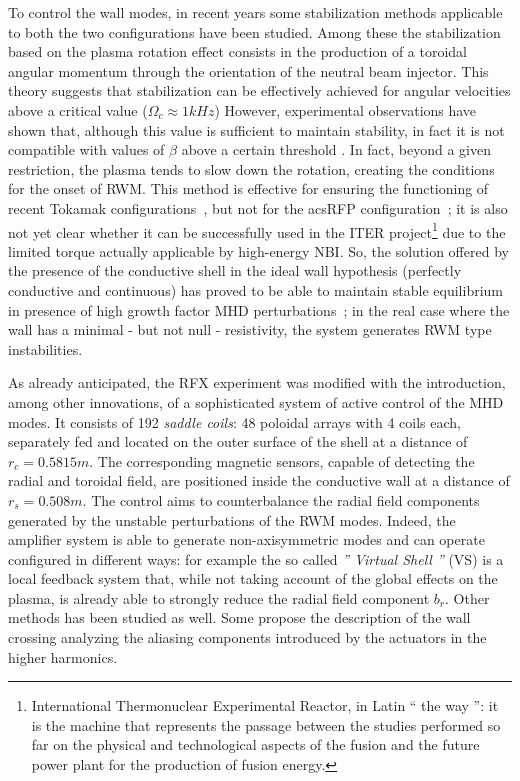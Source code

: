 To control the wall modes, in recent years some stabilization methods applicable to both the two configurations have been studied. Among these the stabilization based on the plasma rotation effect consists in the production of a toroidal angular momentum through the orientation of the neutral beam injector. This theory suggests that stabilization can be effectively achieved for angular velocities above a critical value ($\Omega_c \approx 1 kHz$) However, experimental observations have shown that, although this value is sufficient to maintain stability, in fact it is not compatible with values of $\beta$ above a certain threshold \cite{baruzzo12}. In fact, beyond a given restriction, the plasma tends to slow down the rotation, creating the conditions for the onset of \acs{RWM}. This method is effective for ensuring the functioning of recent Tokamak configurations~\cite{baruzzo12}, but not for the acs{RFP} configuration~\cite{baruzzo13}; it is also not yet clear whether it can be successfully used in the ITER project\footnote{International Thermonuclear Experimental Reactor, in Latin `` the way '': it is the machine that represents the passage between the studies performed so far on the physical and technological aspects of the fusion and the future power plant for the production of fusion energy.} due to the limited torque actually applicable by high-energy \acs{NBI}.
%
So, the solution offered by the presence of the conductive shell in the ideal wall hypothesis (perfectly conductive and continuous) has proved to be able to maintain stable equilibrium in presence of high growth factor MHD perturbations~\cite{gimblett_5,gimblett_6}; in the real case where the wall has a minimal - but not null - resistivity, the system generates \acs{RWM} type instabilities.

As already anticipated, the RFX experiment was modified with the introduction, among other innovations, of a sophisticated system of active control of the MHD modes. It consists of 192 \textit{saddle coils}: 48 poloidal arrays with 4 coils each, separately fed and located on the outer surface of the shell at a distance of $r_c = 0.5815m$. The corresponding magnetic sensors, capable of detecting the radial and toroidal field, are positioned inside the conductive wall at a distance of $r_s = 0.508m$. The control aims to counterbalance the radial field components generated by the unstable perturbations of the RWM modes. Indeed, the amplifier system is able to generate non-axisymmetric modes and can operate configured in different ways: for example the so called \emph{'' Virtual Shell ''} (VS) is a local feedback system that, while not taking account of the global effects on the plasma, is already able to strongly reduce the radial field component $b_r$\cite{pizz78}\cite{pizz79}. Other methods has been studied as well. Some propose the description of the wall crossing analyzing the aliasing components introduced by the actuators in the higher harmonics\cite{pizz81}.

